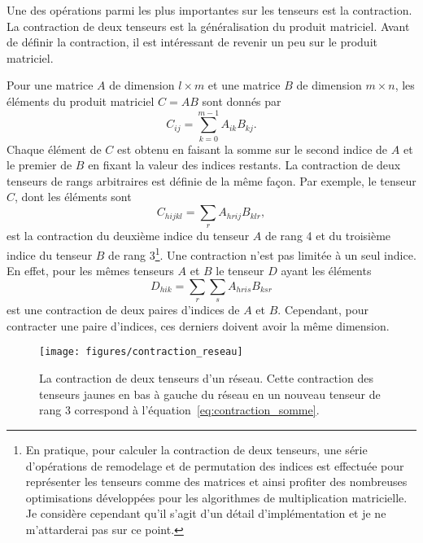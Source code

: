 Une des opérations parmi les plus importantes sur les tenseurs est la contraction.
La contraction de deux tenseurs est la généralisation du produit matriciel.
Avant de définir la contraction,
il est intéressant de revenir un peu sur le produit matriciel.

Pour une matrice $A$ de dimension $l \times m$ et une matrice $B$ de dimension $m \times n$,
les éléments du produit matriciel $C = AB$ sont donnés par
\begin{equation}
  C_{ij} = \sum_{k=0}^{m - 1} A_{ik} B_{kj}.
\end{equation}
Chaque élément de $C$ est obtenu en faisant 
la somme sur le second indice de $A$ et le premier de $B$ 
en fixant la valeur des indices restants.
La contraction de deux tenseurs de rangs arbitraires est définie 
de la même façon.
Par exemple, 
le tenseur $C$, dont les éléments sont
\begin{equation}
  C_{hijkl} = \sum_{r} A_{hrij} B_{klr},
\end{equation}
est la contraction du deuxième indice du tenseur $A$ de rang 4
et du troisième indice du tenseur $B$ de rang 3\footnote{
En pratique, pour calculer la contraction de deux tenseurs, 
une série d'opérations de remodelage et de permutation des indices 
est effectuée pour représenter les tenseurs comme des matrices et 
ainsi profiter des nombreuses optimisations développées pour les algorithmes
de multiplication matricielle.
Je considère cependant qu'il s'agit d'un détail d'implémentation 
et je ne m'attarderai pas sur ce point.
}.
Une contraction n'est pas limitée à un seul indice.
En effet,
pour les mêmes tenseurs $A$ et $B$ le tenseur $D$ ayant les éléments
\begin{equation}
  D_{hik} = \sum_{r} \sum_{s} A_{hris} B_{ksr}
  \label{eq:contraction_somme}
\end{equation}
est une contraction de deux paires d'indices de $A$ et $B$.
Cependant,
pour contracter une paire d'indices,
ces derniers doivent avoir la même dimension. 

\begin{figure}[t]
  \begin{center}
    \texttt{[image: figures/contraction\_reseau]}
  \end{center}
  \caption[Contraction de deux tenseurs]{
    La contraction de deux tenseurs d'un réseau.
    Cette contraction des tenseurs jaunes en bas à gauche du réseau
    en un nouveau tenseur de rang 3 correspond à l'équation~\eqref{eq:contraction_somme}.
  }
  \label{fig:contraction_reseau}
\end{figure}

